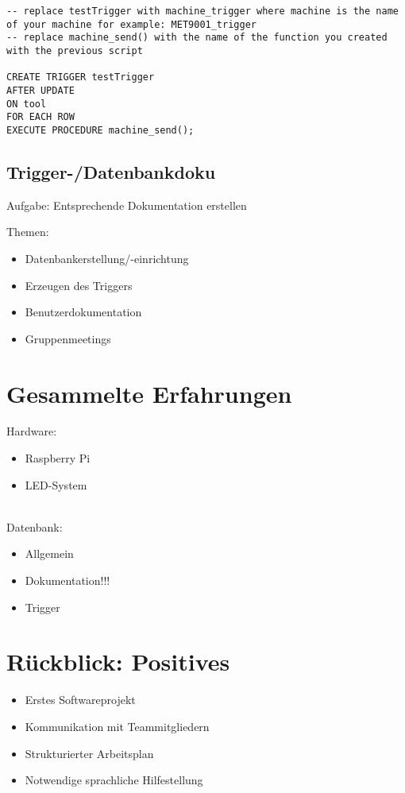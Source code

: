 \documentclass[ignorenonframetext, 11pt, table]{beamer}
\begin{document}
\begin{frame}[fragile]
\begin{lstlisting}[label=trigger2, basicstyle =\tiny]
-- replace testTrigger with machine_trigger where machine is the name of your machine for example: MET9001_trigger
-- replace machine_send() with the name of the function you created with the previous script

CREATE TRIGGER testTrigger
AFTER UPDATE
ON tool
FOR EACH ROW
EXECUTE PROCEDURE machine_send();
\end{lstlisting}
\end{frame}

\subsection{Trigger-/Datenbankdoku}
\begin{frame}
Aufgabe: Entsprechende Dokumentation erstellen\newline\pause

Themen:\pause
\begin{itemize}
\item Datenbankerstellung/-einrichtung \pause
\item Erzeugen des Triggers\pause
\item Benutzerdokumentation\pause
\item Gruppenmeetings
\end{itemize}
\end{frame}

\section{Gesammelte Erfahrungen}
\begin{frame}
Hardware:\pause
\begin{itemize}
\item Raspberry Pi\pause
\item LED-System\pause
\end{itemize}
~\\
Datenbank:
\begin{itemize}
\item Allgemein\pause
\item Dokumentation!!!\pause
\item Trigger
\end{itemize}
\end{frame}

\section{Rückblick: Positives}
\begin{frame}
\begin{itemize}
\item Erstes Softwareprojekt\pause
\item Kommunikation mit Teammitgliedern\pause 
\item Strukturierter Arbeitsplan\pause
\item Notwendige sprachliche Hilfestellung
\end{itemize}
\end{frame}
\end{document}
